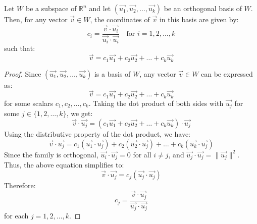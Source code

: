 \begin{theorem}
    Let $W$ be a subspace of $\mathbb{R}^n$ and let $(\vec{u_1}, \vec{u_2}, \ldots, \vec{u_k})$ be an orthogonal basis of $W$. Then, for any vector $\vec{v} \in W$, the coordinates of $\vec{v}$ in this basis are given by:
    \[
        c_i = \frac{\vec{v} \cdot \vec{u_i}}{\vec{u_i} \cdot \vec{u_i}} \quad \text{for } i = 1, 2, \ldots, k
    \]
    such that:
    \[
        \vec{v} = c_1 \vec{u_1} + c_2 \vec{u_2} + \ldots + c_k \vec{u_k}
    \]
\end{theorem}
\begin{proof}
    Since $(\vec{u_1}, \vec{u_2}, \ldots, \vec{u_k})$ is a basis of $W$, any vector $\vec{v} \in W$ can be expressed as:
    \[
        \vec{v} = c_1 \vec{u_1} + c_2 \vec{u_2} + \ldots + c_k \vec{u_k}
    \]
    for some scalars $c_1, c_2, \ldots, c_k$.
    Taking the dot product of both sides with $\vec{u_j}$ for some $j \in \{1, 2, \ldots, k\}$, we get:
    \[
        \vec{v} \cdot \vec{u_j} = (c_1 \vec{u_1} + c_2 \vec{u_2} + \ldots + c_k \vec{u_k}) \cdot \vec{u_j}
    \]
    Using the distributive property of the dot product, we have:
    \[
        \vec{v} \cdot \vec{u_j} = c_1 (\vec{u_1} \cdot \vec{u_j}) + c_2 (\vec{u_2} \cdot \vec{u_j}) + \ldots + c_k (\vec{u_k} \cdot \vec{u_j})
    \]
    Since the family is orthogonal, $\vec{u_i} \cdot \vec{u_j} = 0$ for all $i \neq j$, and $\vec{u_j} \cdot \vec{u_j} = \|\vec{u_j}\|^2$. Thus, the above equation simplifies to:
    \[
        \vec{v} \cdot \vec{u_j} = c_j (\vec{u_j} \cdot \vec{u_j})
    \]
    Therefore:
    \[
        c_j = \frac{\vec{v} \cdot \vec{u_j}}{\vec{u_j} \cdot \vec{u_j}}
    \]
    for each $j = 1, 2, \ldots, k$.
\end{proof}

